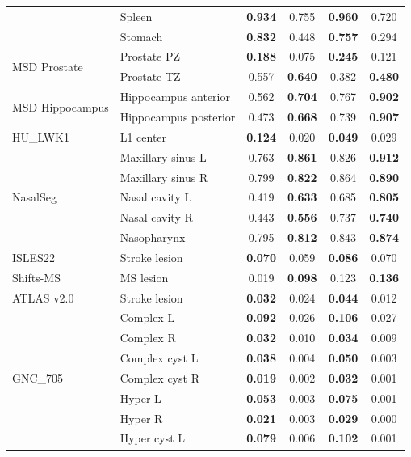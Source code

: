 \documentclass[hidelinks, a4paper, 12pt, ngerman, english]{article}  %
\begin{document}
\begin{longtable}{@{}llcccc@{}}
   & Spleen & \textbf{0.934} & 0.755 & \textbf{0.960} & 0.720 \\
   & Stomach & \textbf{0.832} & 0.448 & \textbf{0.757} & 0.294 \\
  \midrule
  \multirow{2}{*}{MSD Prostate} & Prostate PZ & \textbf{0.188} & 0.075 & \textbf{0.245} & 0.121 \\
   & Prostate TZ & 0.557 & \textbf{0.640} & 0.382 & \textbf{0.480} \\
  \midrule
  \multirow{2}{*}{MSD Hippocampus} & Hippocampus anterior & 0.562 & \textbf{0.704} & 0.767 & \textbf{0.902} \\
   & Hippocampus posterior & 0.473 & \textbf{0.668} & 0.739 & \textbf{0.907} \\
  \midrule
  HU\_LWK1 & L1 center & \textbf{0.124} & 0.020 & \textbf{0.049} & 0.029 \\
  \midrule
  \multirow{5}{*}{NasalSeg} & Maxillary sinus L & 0.763 & \textbf{0.861} & 0.826 & \textbf{0.912} \\
   & Maxillary sinus R & 0.799 & \textbf{0.822} & 0.864 & \textbf{0.890} \\
   & Nasal cavity L & 0.419 & \textbf{0.633} & 0.685 & \textbf{0.805} \\
   & Nasal cavity R & 0.443 & \textbf{0.556} & 0.737 & \textbf{0.740} \\
   & Nasopharynx & 0.795 & \textbf{0.812} & 0.843 & \textbf{0.874} \\
  \midrule
  ISLES22 & Stroke lesion & \textbf{0.070} & 0.059 & \textbf{0.086} & 0.070 \\
  \midrule
  Shifts-MS & MS lesion & 0.019 & \textbf{0.098} & 0.123 & \textbf{0.136} \\
  \midrule
  ATLAS v2.0 & Stroke lesion & \textbf{0.032} & 0.024 & \textbf{0.044} & 0.012 \\
  \midrule
  \multirow{13}{*}{GNC\_705} & Complex L & \textbf{0.092} & 0.026 & \textbf{0.106} & 0.027 \\
   & Complex R & \textbf{0.032} & 0.010 & \textbf{0.034} & 0.009 \\
   & Complex cyst L & \textbf{0.038} & 0.004 & \textbf{0.050} & 0.003 \\
   & Complex cyst R & \textbf{0.019} & 0.002 & \textbf{0.032} & 0.001 \\
   & Hyper L & \textbf{0.053} & 0.003 & \textbf{0.075} & 0.001 \\
   & Hyper R & \textbf{0.021} & 0.003 & \textbf{0.029} & 0.000 \\
   & Hyper cyst L & \textbf{0.079} & 0.006 & \textbf{0.102} & 0.001 \\

\end{longtable}
\end{document}
